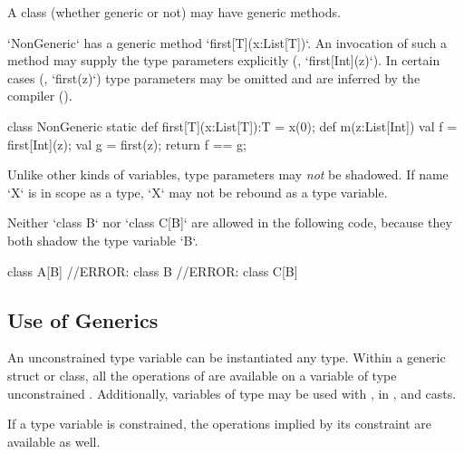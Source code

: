 A class (whether generic or not) may have generic methods.

\begin{ex}
\xcd`NonGeneric` has a generic method 
\xcd`first[T](x:List[T])`. An invocation of such a method may supply
the type parameters explicitly (\eg, \xcd`first[Int](z)`).
 In certain cases (\eg, \xcd`first(z)`)
type parameters may
be omitted and are inferred by the compiler ().

\begin{xten}
class NonGeneric {
  static def first[T](x:List[T]):T = x(0);
  def m(z:List[Int]) {
    val f = first[Int](z);
    val g = first(z);
    return f == g;
  }
}
\end{xten}
%


\end{ex}



Unlike other kinds of variables, type parameters may {\em not} be shadowed.  
If name \xcd`X` is in scope as a type, \xcd`X` may not be rebound as a type
variable.  

\begin{ex}
Neither \xcd`class B` nor \xcd`class C[B]` are allowed in the
following code, because they both shadow the type variable \xcd`B`.
\begin{xten}
class A[B] {
  //ERROR: class B{} 
  //ERROR: class C[B]{} 
}
\end{xten}
%
\end{ex}

\subsection{Use of Generics}

An unconstrained type variable  can be instantiated any type. Within a
generic struct or class, all the operations of  are available on a
variable of type unconstrained . Additionally, variables of type
 may be used with \Xcd{==, !=}, in , and casts.  

If a type variable is constrained, the operations implied by its constraint
are available as well.


